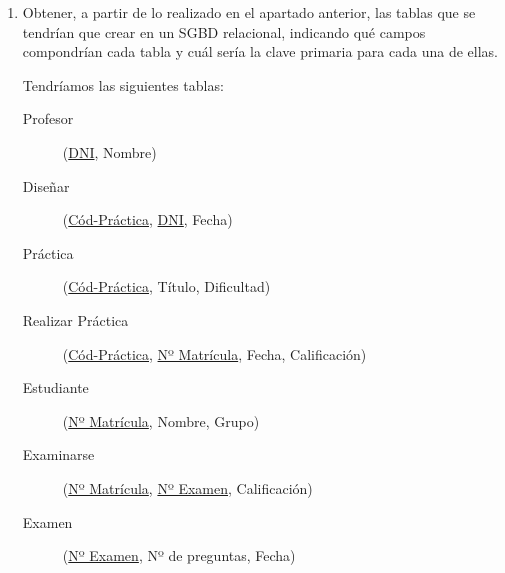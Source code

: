 \begin{ejercicio}
\begin{enumerate}
        \item Obtener, a partir de lo realizado en el apartado anterior, las tablas que se tendrían que crear en un SGBD relacional, indicando qué campos compondrían cada tabla y cuál sería la clave primaria para cada una de ellas.

        Tendríamos las siguientes tablas:
        \begin{description}
            \item [Profesor] (\underline{DNI}, Nombre)
            \item [Diseñar] (\underline{Cód-Práctica}, \underline{DNI}, Fecha)
            \item [Práctica] (\underline{Cód-Práctica}, Título, Dificultad)
            \item [Realizar Práctica] (\underline{Cód-Práctica}, \underline{Nº Matrícula}, Fecha, Calificación)
            \item [Estudiante] (\underline{Nº Matrícula}, Nombre, Grupo)
            \item [Examinarse] (\underline{Nº Matrícula}, \underline{Nº Examen}, Calificación)
            \item [Examen] (\underline{Nº Examen}, Nº de preguntas, Fecha)
        \end{description}
    \end{enumerate}

    

    


\end{ejercicio}




